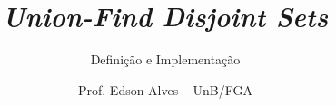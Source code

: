 \title{\it Union-Find Disjoint Sets}
\subtitle{Definição e Implementação}
\author{Prof. Edson Alves -- UnB/FGA}
\date{}
